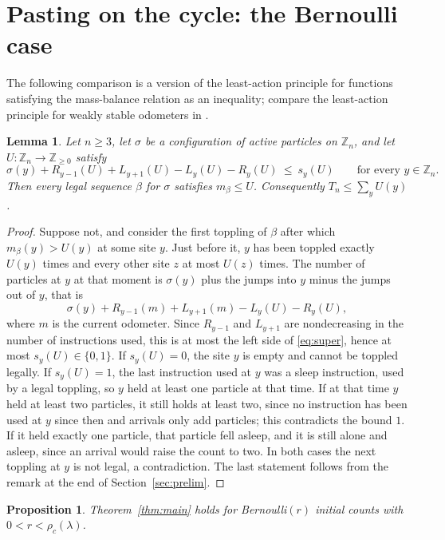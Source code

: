 \documentclass[11pt]{amsart}
\newtheorem{proposition}[theorem]{Proposition}
\newtheorem{lemma}[theorem]{Lemma}
\theoremstyle{remark}
\newcommand{\Z}{\mathbb Z}
\begin{document}
\section{Pasting on the cycle: the Bernoulli case}\label{sec:paste}

The following comparison is a version of the least-action principle for functions satisfying the mass-balance relation
as an inequality; compare the least-action principle for weakly stable odometers in \cite[Lemma~2.3]{HJJ}.

\begin{lemma}\label{lem:super}
Let $n\ge3$, let $\sigma$ be a configuration of active particles on $\Z_n$, and let $U:\Z_n\to\Z_{\ge0}$ satisfy
\begin{equation}\label{eq:super}
\sigma(y)+R_{y-1}(U)+L_{y+1}(U)-L_y(U)-R_y(U)\ \le\ s_y(U)\qquad\text{for every }y\in\Z_n .
\end{equation}
Then every legal sequence $\beta$ for $\sigma$ satisfies $m_\beta\le U$. Consequently $T_n\le\sum_y U(y)$.
\end{lemma}

\begin{proof}
Suppose not, and consider the first toppling of $\beta$ after which $m_\beta(y)>U(y)$ at some site $y$. Just before it,
$y$ has been toppled exactly $U(y)$ times and every other site $z$ at most $U(z)$ times. The number of particles at $y$ at
that moment is $\sigma(y)$ plus the jumps into $y$ minus the jumps out of $y$, that is
\[
\sigma(y)+R_{y-1}(m)+L_{y+1}(m)-L_y(U)-R_y(U),
\]
where $m$ is the current odometer. Since $R_{y-1}$ and $L_{y+1}$ are nondecreasing in the number of instructions used,
this is at most the left side of \eqref{eq:super}, hence at most $s_y(U)\in\{0,1\}$. If $s_y(U)=0$, the site $y$ is empty
and cannot be toppled legally. If $s_y(U)=1$, the last instruction used at $y$ was a sleep instruction, used by a
legal toppling, so $y$ held at least one particle at that time. If at that time
$y$ held at least two particles, it still holds at least two, since no instruction has been used at $y$ since then and
arrivals only add particles; this contradicts the bound $1$. If it held exactly one particle, that particle fell asleep,
and it is still alone and asleep, since an arrival would raise the count to two. In both cases the next toppling at $y$
is not legal, a contradiction. The last statement follows from the remark at the end of Section~\ref{sec:prelim}.
\end{proof}

\begin{proposition}\label{prop:bernoulli}
Theorem~\ref{thm:main} holds for Bernoulli$(r)$ initial counts with $0<r<\rho_c(\lambda)$.
\end{proposition}
\end{document}
